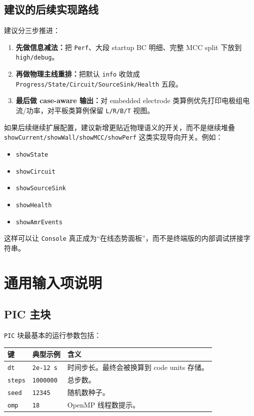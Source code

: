 \documentclass[11pt,a4paper]{ctexart}
\newcommand{\code}[1]{\texttt{#1}}
\begin{document}
\subsection{建议的后续实现路线}

建议分三步推进：

\begin{enumerate}
  \item \textbf{先做信息减法：}把 \code{Perf}、大段 startup BC 明细、完整 MCC split 下放到 \code{high/debug}。
  \item \textbf{再做物理主线重排：}把默认 \code{info} 收敛成 \code{Progress/State/Circuit/SourceSink/Health} 五段。
  \item \textbf{最后做 case-aware 输出：}对 embedded electrode 类算例优先打印电极组电流/功率，对平板类算例保留 \code{L/R/B/T} 视图。
\end{enumerate}

如果后续继续扩展配置，建议新增更贴近物理语义的开关，而不是继续堆叠 \code{showCurrent/showWall/showMCC/showPerf} 这类实现导向开关。例如：

\begin{itemize}
  \item \code{showState}
  \item \code{showCircuit}
  \item \code{showSourceSink}
  \item \code{showHealth}
  \item \code{showAmrEvents}
\end{itemize}

这样可以让 \code{Console} 真正成为``在线态势面板''，而不是终端版的内部调试拼接字符串。

\section{通用输入项说明}

\subsection{PIC 主块}

\code{PIC} 块最基本的运行参数包括：

\begin{longtable}{p{}p{}p{}}
\toprule
键 & 典型示例 & 含义 \\
\midrule
\endhead
\code{dt} & \code{2e-12 s} & 时间步长。最终会被换算到 code units 存储。 \\
\code{steps} & \code{1000000} & 总步数。 \\
\code{seed} & \code{12345} & 随机数种子。 \\
\code{omp} & \code{18} & OpenMP 线程数提示。 \\
\bottomrule
\end{longtable}
\end{document}
